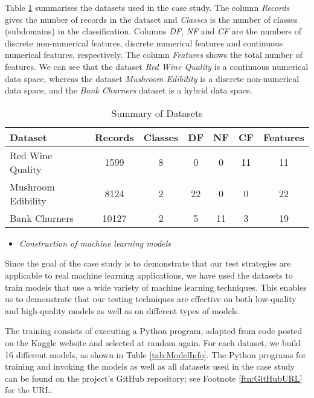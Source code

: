 \documentclass[preprint,1p,authoryear,times]{elsarticle}
\begin{document}
Table \ref{tab:SummaryDatasets} summarises the datasets used in the case study. The column \emph{Records} gives the number of records in the dataset and \emph{Classes} is the number of classes (subdomains) in the classification. Columns \emph{DF}, \emph{NF} and \emph{CF} are the numbers of discrete non-numerical features, discrete numerical features and continuous numerical features, respectively. The column \emph{Features} shows the total number of features. We can see that the dataset \emph{Red Wine Quality} is a continuous numerical data space, whereas the dataset \emph{Mushroom Edibility} is a discrete non-numerical data space, and the \emph{Bank Churners} dataset is a hybrid data space. 
 
\begin{table}[htbp]
\caption{Summary of Datasets}
\begin{small}
\begin{center}
\begin{tabular}{|l|c|c|c|c|c|c|}
\hline
\textbf{Dataset} &\textbf{Records} &\textbf{Classes} &\textbf{DF} &\textbf{NF} &\textbf{CF} &\textbf{Features}  \\ \hline
Red Wine Quality 	&1599	&8	&0	&0	&11	&11\\ \hline
Mushroom Edibility	&8124	&2	&22	&0	&0	&22\\ \hline
Bank Churners	&10127	&2	&5	&11	&3	&19\\ \hline
\end{tabular}
\end{center}
\end{small}
\label{tab:SummaryDatasets}
\end{table}%

\begin{itemize}
\item \emph{Construction of machine learning models}
\end{itemize}

Since the goal of the case study is to demonstrate that our test strategies are applicable to real machine learning applications, we have used the datasets to train models that use a wide variety of machine learning techniques. This enables us to demonstrate that our testing techniques are effective on both low-quality and high-quality models as well as on different types of models.

The training consists of executing a Python program, adapted from code posted on the Kaggle website  and selected at random again. For each dataset, we  build 16 different models, as shown in Table \ref{tab:ModelInfo}. The Python programs for training and invoking the models as well as all datasets used in the case study can be found on the project's GitHub repository; see Footnote \ref{ftn:GitHubURL} for the URL.
\end{document}
